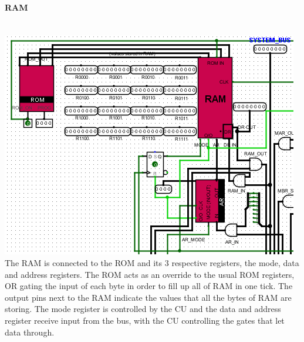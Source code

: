 \documentclass{article}
\begin{document}
	\paragraph{RAM}~
	\\ \includegraphics[scale=0.5]{RAM} \\The RAM is connected to the ROM and its $3$ respective registers, the mode, data and address registers. The ROM acts as an override to the usual ROM registers, OR gating the input of each byte in order to fill up all of RAM in one tick. The output pins next to the RAM indicate the values that all the bytes of RAM are storing. The mode register is controlled by the CU and the data and address register receive input from the bus, with the CU controlling the gates that let data through.
\end{document}
